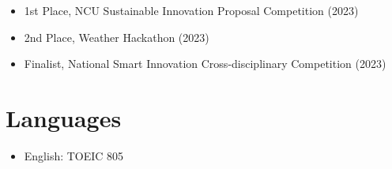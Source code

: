 \documentclass[10pt, a4paper]{article}
\begin{document}
\begin{minipage}[t]{0.37\textwidth}
\begin{itemize}
  \item 1st Place, NCU Sustainable Innovation Proposal Competition (2023)
  \item 2nd Place, Weather Hackathon (2023)
  \item Finalist, National Smart Innovation Cross-disciplinary Competition (2023)
\end{itemize}\vspace{3pt}

\section{Languages}

\begin{itemize}
  \item English: TOEIC 805
\end{itemize}

\end{minipage}
\end{document}
